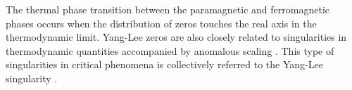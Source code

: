 \documentclass[aps,prl,twocolumn,superscriptaddress]{revtex4-1}
\begin{document}
The thermal phase transition between the paramagnetic and ferromagnetic phases occurs when the distribution of zeros %
touches the real axis in the thermodynamic limit. Yang-Lee zeros are also closely related to singularities in thermodynamic quantities accompanied by anomalous scaling \cite{Fisher:1978vn,Kurtze:1979wb,10.1143/PTP.69.14,Cardy:1985ub,Cardy:1989uo,Zamolodchikov:1991tl}.
This type of singularities in critical phenomena is collectively referred to the Yang-Lee singularity \cite{BENA2005}.
\begin{comment}
which, together with Yang-Lee zeros, has also been applied to quantum phase transitions \cite{Gehlen_1991,Sumaryada:2007uu,PhysRevB.53.7704,Matsumoto2020,PhysRevResearch.3.033206,PhysRevB.106.054402,PhysRevE.96.032116,PhysRevX.11.041018,PhysRevE.96.032116}. Therefore, Yang-Lee zeros can be applied to characterize the analytic property of thermodynamic quantities and origin of singularities at phase transitions of both classical and quantum many-body systems.

Despite its growing importance on understanding phase transition, it is still highly nontrivial to understand the origin of non-analycity in superconducting phase transition in terms of Yang-Lee zeros. We unveil that Yang-Lee zeros are the key to investigate the mechanism behind the essential singularity and non-perturbative property of Bardeen-Cooper-Schrieffer (BCS) model of superconductivity \cite{Bardeen:1957tx}. In addition, generally it is very difficult to determine the distribution of Yang-Lee zeros for a given model of interests. Here we discover semicircle theorem that Yang-Lee zeros are distributed on a semicricle on the complex plane of interaction strength in marginal fermionic many-body system. The BCS model is one of the examples.
\end{comment}

\end{document}
